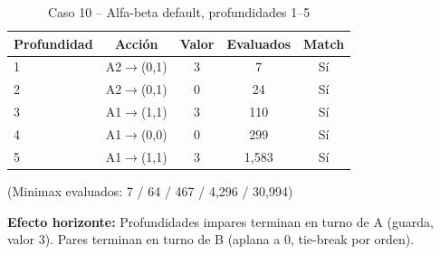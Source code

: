 \begin{table}[H]
\centering
\caption{Caso 10 -- Alfa-beta default, profundidades 1--5}
\begin{tabular}{lcccc}
\toprule
Profundidad & Acción & Valor & Evaluados & Match \\
\midrule
1 & A2$\to$(0,1) & 3 & 7 & Sí \\
2 & A2$\to$(0,1) & 0 & 24 & Sí \\
3 & A1$\to$(1,1) & 3 & 110 & Sí \\
4 & A1$\to$(0,0) & 0 & 299 & Sí \\
5 & A1$\to$(1,1) & 3 & 1,583 & Sí \\
\bottomrule
\end{tabular}
\end{table}

(Minimax evaluados: 7 / 64 / 467 / 4,296 / 30,994)

\textbf{Efecto horizonte:} Profundidades impares terminan en turno de A (guarda, valor 3).
Pares terminan en turno de B (aplana a 0, tie-break por orden).